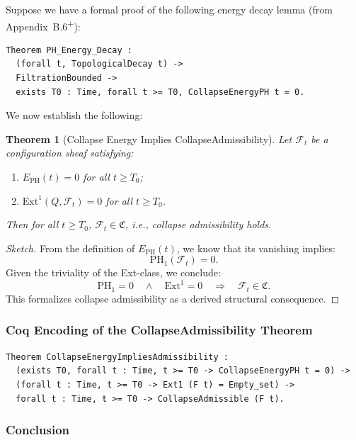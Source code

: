 \documentclass[11pt]{article}
\newtheorem{theorem}{Theorem}[section]
\begin{document}
Suppose we have a formal proof of the following energy decay lemma (from Appendix~B.6\textsuperscript{+}):

\begin{lstlisting}[language=Coq, caption={Imported Energy Decay Lemma}]
Theorem PH_Energy_Decay :
  (forall t, TopologicalDecay t) ->
  FiltrationBounded ->
  exists T0 : Time, forall t >= T0, CollapseEnergyPH t = 0.
\end{lstlisting}

We now establish the following:

\begin{theorem}[Collapse Energy Implies CollapseAdmissibility]
\label{thm:energy-to-admissibility}
Let \( \mathcal{F}_t \) be a configuration sheaf satisfying:
\begin{enumerate}
  \item \( E_{\mathrm{PH}}(t) = 0 \) for all \( t \geq T_0 \);
  \item \( \mathrm{Ext}^1(Q, \mathcal{F}_t) = 0 \) for all \( t \geq T_0 \).
\end{enumerate}
Then for all \( t \geq T_0 \), \( \mathcal{F}_t \in \mathfrak{C} \), i.e., collapse admissibility holds.
\end{theorem}

\begin{proof}[Sketch]
From the definition of \( E_{\mathrm{PH}}(t) \), we know that its vanishing implies:
\[
\mathrm{PH}_1(\mathcal{F}_t) = 0.
\]
Given the triviality of the Ext-class, we conclude:
\[
\mathrm{PH}_1 = 0 \quad \wedge \quad \mathrm{Ext}^1 = 0 \quad \Rightarrow \quad \mathcal{F}_t \in \mathfrak{C}.
\]
This formalizes collapse admissibility as a derived structural consequence.
\end{proof}

\subsubsection*{Coq Encoding of the CollapseAdmissibility Theorem}

\begin{lstlisting}[language=Coq, caption={Formal Theorem: Collapse Energy Implies Admissibility}]
Theorem CollapseEnergyImpliesAdmissibility :
  (exists T0, forall t : Time, t >= T0 -> CollapseEnergyPH t = 0) ->
  (forall t : Time, t >= T0 -> Ext1 (F t) = Empty_set) ->
  forall t : Time, t >= T0 -> CollapseAdmissible (F t).
\end{lstlisting}

\subsubsection*{Conclusion}
\end{document}
